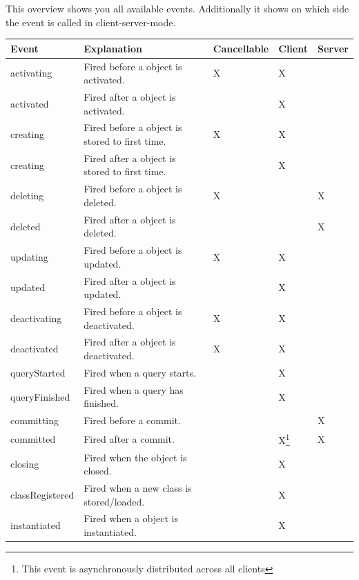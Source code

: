 This overview shows you all available events. Additionally it shows on which side the event is called in client-server-mode.

{\small
\begin{longtable}{|p{}|p{}|p{}|p{}|p{}|}
\hline
\textbf{Event} & \textbf{Explanation} & \textbf{Cancellable} & \textbf{Client} & \textbf{Server} \\ \hline
activating & Fired before a object is activated. & X & X &  \\ \hline
activated & Fired after a object is activated. &  & X &  \\ \hline
creating & Fired before a object is stored to first time. & X & X &  \\ \hline
creating & Fired after a object is stored to first time. &  & X &  \\ \hline
deleting & Fired before a object is deleted. & X &  & X \\ \hline
deleted & Fired after a object is deleted. &  &  & X \\ \hline
updating & Fired before a object is updated. & X & X &  \\ \hline
updated & Fired after a object is updated. &  & X &  \\ \hline
deactivating & Fired before a object is deactivated. & X & X &  \\ \hline
deactivated & Fired after a object is deactivated. & X & X &  \\ \hline
queryStarted & Fired when a query starts. &  & X &  \\ \hline
queryFinished & Fired when a query has finished. &  & X &  \\ \hline
committing & Fired before a commit. &  &  & X \\ \hline
committed & Fired after a commit. &  & X\footnote{This event is asynchronously distributed across all clients} & X \\ \hline
closing & Fired when the object is closed. &  & X &  \\ \hline
classRegistered & Fired when a new class is stored/loaded. &  & X &  \\ \hline
instantiated & Fired when a object is instantiated. &  & X &  \\ \hline
\end{longtable}}

